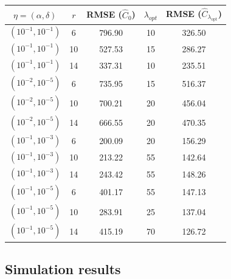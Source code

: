 \documentclass[oupdraft]{bio}
\begin{document}
\begin{table}[h]
\centering
\begin{tabular}{ccccc}
  \hline
$\eta = (\alpha, \delta)$ & $r$ & RMSE ($\widehat{C}_{0}$) & $\lambda_{opt}$ & RMSE ($\widehat{C}_{\lambda_{ \text{opt}}}$) \\ 
  \hline
$\left(10^{-1}, 10^{-1}\right)$ &   6 & 796.90 &  10 & 326.50 \\ 
$\left(10^{-1}, 10^{-1}\right)$ &  10 & 527.53 &  15 & 286.27 \\ 
  $\left(10^{-1}, 10^{-1}\right)$ &  14 & 337.31 &  10 & 235.51 \\ 
  $\left(10^{-2}, 10^{-5}\right)$ &   6 & 735.95 &  15 & 516.37 \\ 
  $\left(10^{-2}, 10^{-5}\right)$ &  10 & 700.21 &  20 & 456.04 \\ 
  $\left(10^{-2}, 10^{-5}\right)$ &  14 & 666.55 &  20 & 470.35 \\ 
  $\left(10^{-1}, 10^{-3}\right)$ &   6 & 200.09 &  20 & 156.29 \\ 
  $\left(10^{-1}, 10^{-3}\right)$ &  10 & 213.22 &  55 & 142.64 \\ 
  $\left(10^{-1}, 10^{-3}\right)$ &  14 & 243.42 &  55 & 148.26 \\ 
  $\left(10^{-1}, 10^{-5}\right)$ &   6 & 401.17 &  55 & 147.13 \\ 
  $\left(10^{-1}, 10^{-5}\right)$ &  10 & 283.91 &  25 & 137.04 \\ 
  $\left(10^{-1}, 10^{-5}\right)$ &  14 & 415.19 &  70 & 126.72 \\ 
   \hline
\end{tabular}
\end{table}

\subsection{Simulation results}
\end{document}
